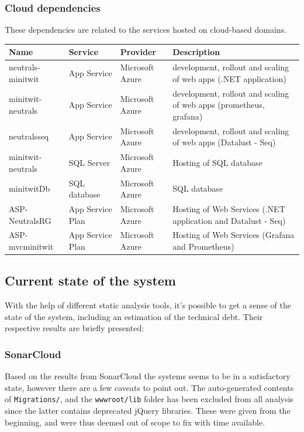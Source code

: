 \documentclass{article}
\begin{document}
\subsubsection{Cloud dependencies}
These dependencies are related to the services hosted on cloud-based domains.

\begin{table}[H]
\begin{tabularx}{\textwidth}{|l|l|l|X|}
\hline
    \textbf{Name} & \textbf{Service} & \textbf{Provider} & \textbf{Description} \\ \hline
    neutrals-minitwit & App Service & Microsoft Azure & development, rollout and scaling of web apps (.NET application) \\ \hline
    minitwit-neutrals & App Service & Microsoft Azure &development, rollout and scaling of web apps (prometheus, grafana) \\ \hline
    neutralsseq & App Service & Microsoft Azure & development, rollout and scaling of web apps (Datalust - Seq) \\ \hline
    minitwit-neutrals & SQL Server & Microsoft Azure & Hosting of SQL database \\ \hline
    minitwitDb & SQL database & Microsoft Azure & SQL database \\ \hline
    ASP-NeutralsRG & App Service Plan & Microsoft Azure & Hosting of Web Services (.NET application and Datalust - Seq) \\ \hline
    ASP-mvcminitwit & App Service Plan & Microsoft Azure & Hosting of Web Services (Grafana and Prometheus) \\ \hline
\end{tabularx}
\end{table}

\subsection{Current state of the system} 
With the help of different static analysis tools, it's possible to get a sense of the state of the system, including an estimation of the technical debt. Their respective results are briefly presented:

\subsubsection*{SonarCloud}
Based on the results from SonarCloud the systems seems to be in a satisfactory state, however there are a few caveats to point out. The auto-generated contents of \texttt{Migrations/}, and the \texttt{wwwroot/lib} folder has been excluded from all analysis since the latter contains deprecated jQuery libraries. These were given from the beginning, and were thus deemed out of scope to fix with time available. 
\end{document}
